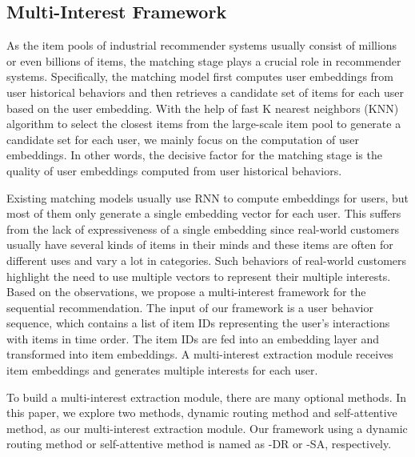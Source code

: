 \subsection{Multi-Interest Framework}
As the item pools of industrial recommender systems usually consist of millions or even billions of items, the matching stage plays a crucial role in recommender systems. Specifically, the matching model first computes user embeddings from user historical behaviors and then retrieves a candidate set of items for each user based on the user embedding. With the help of fast K nearest neighbors (KNN) algorithm to select the closest items from the large-scale item pool to generate a candidate set for each user, we mainly focus on the computation of user embeddings. In other words, the decisive factor for the matching stage is the quality of user embeddings computed from user historical behaviors. 

Existing matching models usually use RNN\cite{hidasi2015session,wu2017recurrent} to compute embeddings for users, but most of them only generate a single embedding vector for each user. This suffers from the lack of expressiveness of a single embedding since real-world customers usually have several kinds of items in their minds and these items are often for different uses and vary a lot in categories. Such behaviors of real-world customers highlight the need to use multiple vectors to represent their multiple interests. Based on the observations, we propose a multi-interest framework for the sequential recommendation. The input of our framework is a user behavior sequence, which contains a list of item IDs representing the user's interactions with items in time order. The item IDs are fed into an embedding layer and transformed into item embeddings. A multi-interest extraction module receives item embeddings and generates multiple interests for each user.


To build a multi-interest extraction module, there are many optional methods. In this paper, we explore two methods, dynamic routing method and self-attentive method, as our multi-interest extraction module. Our framework using a dynamic routing method or self-attentive method is named as \model-DR or \model-SA, respectively. 

